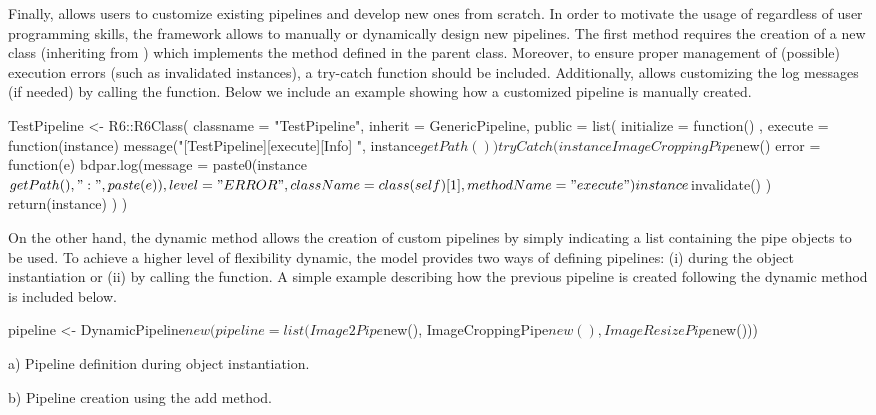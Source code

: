Finally,  allows users to customize existing pipelines and develop new ones from scratch. In order to motivate the usage of  regardless of user programming skills, the framework allows to manually or dynamically design new pipelines. The first method requires the creation of a new class (inheriting from ) which implements the  method defined in the parent class. Moreover, to ensure proper management of (possible) execution errors (such as invalidated instances), a try-catch function should be included. Additionally,  allows customizing the log messages (if needed) by calling the  function. Below we include an example showing how a customized pipeline is manually created. 

\begin{example*}
TestPipeline <- R6::R6Class(
  classname = "TestPipeline",
  inherit = GenericPipeline,
  public = list(
    initialize = function() {},
    execute = function(instance) {
      message("[TestPipeline][execute][Info] ", instance$getPath())
      tryCatch(
         instance %
             ImageCroppingPipe$new() %
          error = function(e) {
               bdpar.log(message = paste0(instance$getPath()," :", paste(e)),
                 level= "ERROR",
                 className= class(self)[1],
                 methodName= "execute")
                 instance$invalidate()
        } )
      return(instance)
    } ) )
\end{example*}

On the other hand, the dynamic method allows the creation of custom pipelines by simply indicating a list containing the pipe objects to be used. To achieve a higher level of flexibility dynamic, the model provides two ways of defining pipelines: (i) during the object instantiation or (ii) by calling the  function. A simple example describing how the previous pipeline is created following the dynamic method is included below.

\begin{example}
pipeline <- DynamicPipeline$new(pipeline= list(Image2Pipe$new(),
                                               ImageCroppingPipe$new(), 
                                               ImageResizePipe$new()))
\end{example}
a) Pipeline definition during object instantiation.

b) Pipeline creation using the add method.

